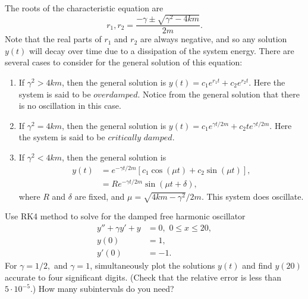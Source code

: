 The roots of the characteristic equation are \[r_1,r_2 = \frac{-\gamma \pm \sqrt{\gamma^2 -4km}}{2m} .\]
Note that the real parts of $r_1$ and $r_2$ are always negative, and so any solution $y(t)$ will decay over time due to a dissipation of the system energy. There are several cases to consider for the general solution of this equation: 
\begin{enumerate}
\item If $\gamma^2 > 4km$, then the general solution is $y(t) = c_1 e^{r_1t} + c_2e^{r_2t}$. Here the system is said to be $\textit{overdamped}$. Notice from the general solution that there is no oscillation in this case.
\item If $\gamma^2 = 4km$, then the general solution is $y(t) = c_1 e^{\gamma t/2m} + c_2 te^{\gamma t/2m}$. Here the system is said to be $\textit{critically damped}$. 
\item If $\gamma^2 < 4km$, then the general solution is 
\begin{align*}
y(t) &= e^{-\gamma t/2m} \left[c_1\cos(\mu t) + c_2 \sin (\mu t)\right],\\
&= R e^{-\gamma t/2m}  \sin (\mu t + \delta),
\end{align*}
where $R$ and $\delta$ are fixed, and $\mu = \sqrt{4km-\gamma^2}/2m.$ This system does oscillate.
\end{enumerate}



\begin{problem}
Use RK4 method to solve for the damped free harmonic oscillator 
\begin{align*}
y'' +\gamma y'+ y &= 0, \,\, 0 \leq x \leq 20,\\
y(0) &= 1, \\
y'(0) &= -1.
\end{align*} 
For $\gamma = 1/2,$ and $\gamma = 1$, simultaneously plot the solutions $y(t)$ and find $y(20)$ accurate to four significant digits. (Check that the relative error is less than $5 \cdot 10^{-5}$.)  How many subintervals do you need?
\end{problem}





